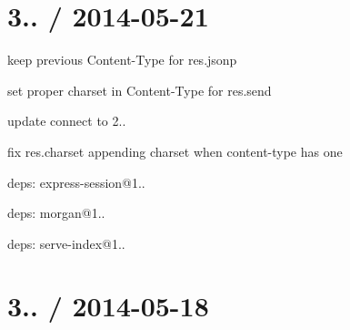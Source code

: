 {\ttfamily \section*{3.. / 2014-\/05-\/21 }}

{\ttfamily }

{\ttfamily 
\begin{DoxyItemize}
\item keep previous {\ttfamily Content-\/\+Type} for {\ttfamily res.\+jsonp}
\item set proper {\ttfamily charset} in {\ttfamily Content-\/\+Type} for {\ttfamily res.\+send}
\item update connect to 2..
\begin{DoxyItemize}
\item fix {\ttfamily res.\+charset} appending charset when {\ttfamily content-\/type} has one
\item deps\+: express-\/session@1..
\item deps\+: morgan@1..
\item deps\+: serve-\/index@1..
\end{DoxyItemize}
\end{DoxyItemize}}

{\ttfamily \section*{3.. / 2014-\/05-\/18 }}

{\ttfamily }

